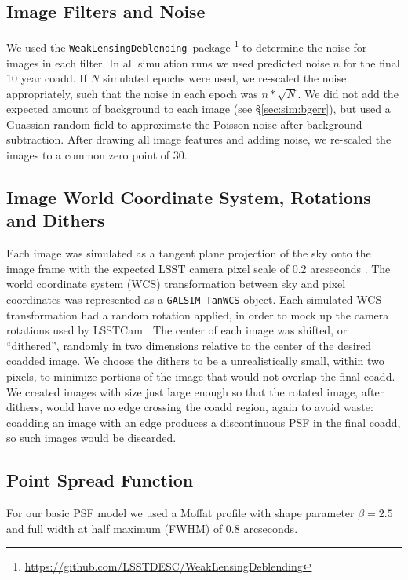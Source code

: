 \documentclass[twocolumn,twocolappendix,astrosym]{openjournal}
\newcommand{\descwl}{\texttt{WeakLensingDeblending}}
\newcommand{\galsim}{\texttt{GALSIM}}
\begin{document}
\subsection{Image Filters and Noise} \label{sec:sim:noise}

We used the \descwl\ package
\citep{DESCWLSanchez2021}\footnote{\url{https://github.com/LSSTDESC/WeakLensingDeblending}}
to determine the noise for images in each filter.  In all simulation runs we
used predicted noise $n$ for the final 10 year coadd.  If $N$ simulated epochs
were used, we re-scaled the noise appropriately, such that the noise in each
epoch was $n * \sqrt{N}$.  We did not add the expected amount of background to
each image (see \S \ref{sec:sim:bgerr}), but used a Guassian random field to
approximate the Poisson noise after background subtraction.  After drawing all
image features and adding noise, we re-scaled the images to a common zero point
of 30.

\subsection{Image World Coordinate System, Rotations and Dithers} \label{sec:sim:rotdith}

Each image was simulated as a tangent plane projection of the sky onto the
image frame with the expected LSST camera pixel scale of 0.2 arcseconds
\citep{IvezicLSST2008}.  The world coordinate system (WCS) transformation between
sky and pixel coordinates was represented as a \galsim\ \texttt{TanWCS} object.
Each simulated WCS transformation had a random rotation applied, in order to
mock up the camera rotations used by LSSTCam \citep{IvezicLSST2008}.  The
center of each image was shifted, or ``dithered'', randomly in two dimensions
relative to the center of the desired coadded image.  We choose the dithers to
be a unrealistically small, within two pixels, to minimize portions of the
image that would not overlap the final coadd.  We created images with size just
large enough so that the rotated image, after dithers, would have no edge
crossing the coadd region, again to avoid waste:  coadding an image with an
edge produces a discontinuous PSF in the final coadd, so such images would be
discarded.

\subsection{Point Spread Function} \label{sec:sim:psfs}

For our basic PSF model we used a Moffat profile \citep{Moffat1969} with
shape parameter $\beta=2.5$ and full width at half maximum (FWHM) of 0.8 arcseconds.
\end{document}
